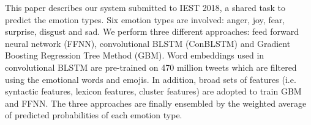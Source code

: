 This paper describes our system submitted to IEST 2018,  a shared task to predict the emotion types. Six emotion types are involved: anger, joy, fear, surprise, disgust and sad. We perform three different approaches: feed forward neural network (FFNN), convolutional BLSTM (ConBLSTM) and Gradient Boosting Regression Tree Method (GBM). Word embeddings used in convolutional BLSTM are pre-trained on 470 million tweets which are filtered using the emotional words and emojis. In addition, broad sets of features (i.e. syntactic features, lexicon features, cluster features) are adopted to train GBM and FFNN. The three approaches are finally ensembled by the weighted average of predicted probabilities of each emotion type.
